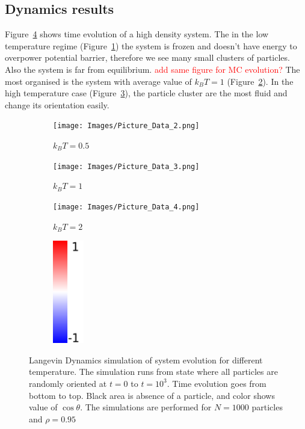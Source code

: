 \subsection{Dynamics results}
\label{subsec:molecular_dynamics_results}

Figure~\ref{fig:high_density_system_evolution} shows time evolution of a high density system. The in the low temperature regime (Figure~\ref{fig:high_density_system_evolution:low_t}) the system is frozen and doesn't have energy to overpower potential barrier, therefore we see many small clusters of particles. Also the system is far from equilibrium. \textcolor{red}{add same figure for MC evolution?} The most organised is the system with average value of $k_BT = 1$ (Figure~\ref{fig:high_density_system_evolution:mid_t}). In the high temperature case (Figure~\ref{fig:high_density_system_evolution:high_t}), the particle cluster are the most fluid and change its orientation easily.

\begin{figure}[h]
\centering
\begin{subfigure}[t]{0.29\textwidth}
	\centering
	\texttt{[image: Images/Picture\_Data\_2.png]}
	\captionsetup{justification=centering, width=0.9\columnwidth}
	\caption{$k_BT = 0.5$}
	\label{fig:high_density_system_evolution:low_t}
\end{subfigure}
\begin{subfigure}[t]{0.29\textwidth}
	\centering
	\texttt{[image: Images/Picture\_Data\_3.png]}
	\captionsetup{justification=centering, width=0.9\columnwidth}
	\caption{$k_BT = 1$}
	\label{fig:high_density_system_evolution:mid_t}
\end{subfigure}
\begin{subfigure}[t]{0.29\textwidth}
	\centering
	\texttt{[image: Images/Picture\_Data\_4.png]}
	\captionsetup{justification=centering, width=0.9\columnwidth}
	\caption{$k_BT = 2$}
	\label{fig:high_density_system_evolution:high_t}
\end{subfigure}
\begin{subfigure}[t]{0.1\textwidth}
	\includegraphics[height=4.5cm, right]{Images/gradient.png}
\end{subfigure}
\captionsetup{justification=centering, width=0.9\columnwidth}
\caption{Langevin Dynamics simulation of system evolution for different temperature. The simulation runs from state where all particles are randomly oriented at $t = 0$ to $t = 10^3$. Time evolution goes from bottom to top. Black area is absence of a particle, and color shows value of $\cos \theta$. The simulations are performed for $N = 1000$ particles and $\rho = 0.95$}
\label{fig:high_density_system_evolution}
\end{figure}

